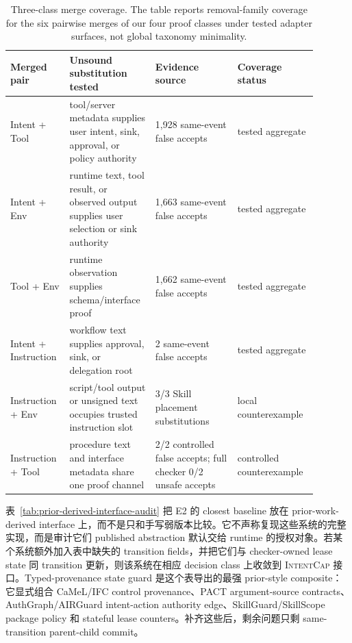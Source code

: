 \documentclass[UTF8,a4paper,11pt]{ctexart}
\newcommand{\sys}{\textsc{IntentCap}\xspace}
\begin{document}
\begin{table}[t]
\centering
\tiny
\setlength{\tabcolsep}{1.3pt}
\caption{Three-class merge coverage. The table reports removal-family coverage for the six pairwise merges of our four proof classes under tested adapter surfaces, not global taxonomy minimality.}
\label{tab:three-class-merge-coverage}
\begin{tabular}{p{0.16\linewidth}p{0.26\linewidth}p{0.25\linewidth}p{0.22\linewidth}}
\toprule
Merged pair & Unsound substitution tested & Evidence source & Coverage status \\
\midrule
Intent + Tool & tool/server metadata supplies user intent, sink, approval, or policy authority & 1,928 same-event false accepts & tested aggregate \\
Intent + Env & runtime text, tool result, or observed output supplies user selection or sink authority & 1,663 same-event false accepts & tested aggregate \\
Tool + Env & runtime observation supplies schema/interface proof & 1,662 same-event false accepts & tested aggregate \\
Intent + Instruction & workflow text supplies approval, sink, or delegation root & 2 same-event false accepts & tested aggregate \\
Instruction + Env & script/tool output or unsigned text occupies trusted instruction slot & 3/3 Skill placement substitutions & local counterexample \\
Instruction + Tool & procedure text and interface metadata share one proof channel & 2/2 controlled false accepts; full checker 0/2 unsafe accepts & controlled counterexample \\
\bottomrule
\end{tabular}
\end{table}

表~\ref{tab:prior-derived-interface-audit} 把 E2 的 closest baseline 放在 prior-work-derived interface 上，而不是只和手写弱版本比较。它不声称复现这些系统的完整实现，而是审计它们 published abstraction 默认交给 runtime 的授权对象。若某个系统额外加入表中缺失的 transition fields，并把它们与 checker-owned lease state 同 transition 更新，则该系统在相应 decision class 上收敛到 \sys 接口。Typed-provenance state guard 是这个表导出的最强 prior-style composite：它显式组合 CaMeL/IFC control provenance、PACT argument-source contracts、AuthGraph/AIRGuard intent-action authority edge、SkillGuard/SkillScope package policy 和 stateful lease counters。补齐这些后，剩余问题只剩 same-transition parent-child commit。
\end{document}
